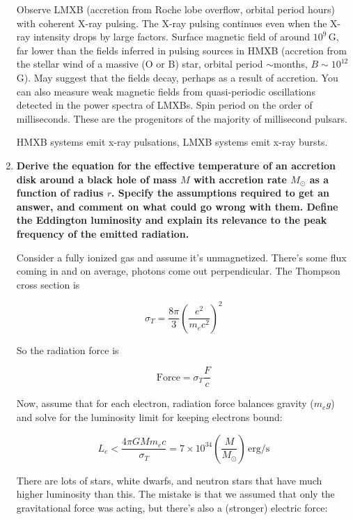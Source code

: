 \documentclass[12pt, letterpaper, preprint]{aastex}
\begin{document}
\begin{enumerate}
Observe LMXB (accretion from Roche lobe overflow, orbital period hours) with coherent X-ray pulsing. The X-ray pulsing continues even when the X-ray intensity drops by large factors. Surface magnetic field of around $10^9$\,G, far lower than the fields inferred in pulsing sources in HMXB (accretion from the stellar wind of a massive (O or B) star, orbital period $\sim$months, $B \sim 10^{12}$\,G). May suggest that the fields decay, perhaps as a result of accretion. You can also measure weak magnetic fields from quasi-periodic oscillations detected in the power spectra of LMXBs. Spin period on the order of milliseconds. These are the progenitors of the majority of millisecond pulsars. 

HMXB systems emit x-ray pulsations, LMXB systems emit x-ray bursts.

\newpage

\item \textbf{Derive the equation for the effective temperature of an accretion disk around a black hole of mass $M$ with accretion rate $M_\odot$ as a function of radius $r$. Specify the assumptions required to get an answer, and comment on what could go wrong with them. Define the Eddington luminosity and explain its relevance to the peak frequency of the emitted radiation.}

Consider a fully ionized gas and assume it's unmagnetized. There's some flux coming in and on average, photons come out perpendicular. The Thompson cross section is

\begin{equation}
\sigma_T = \frac{8 \pi}{3} \left( \frac{e^2}{m_e c^2} \right)^2
\end{equation}

So the radiation force is

\begin{equation}
\mathrm{Force} = \sigma_T \frac{F}{c}
\end{equation}

Now, assume that for each electron, radiation force balances gravity ($m_e g$) and solve for the luminosity limit for keeping electrons bound:

$$ L_e < \frac{4 \pi G M m_e c}{\sigma_T} = 7 \times 10^{34} \left( \frac{M}{M_\odot} \right) \, \mathrm{erg/s}$$

There are lots of stars, white dwarfs, and neutron stars that have much higher luminosity than this. The mistake is that we assumed that only the gravitational force was acting, but there's also a (stronger) electric force:


\end{enumerate}
\end{document}
